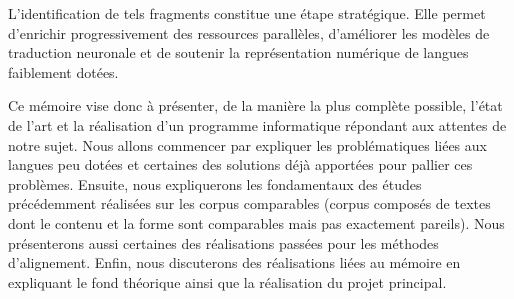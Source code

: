 L’identification de tels fragments constitue une étape stratégique. Elle permet d’enrichir progressivement
des ressources parallèles, d’améliorer les modèles de traduction neuronale et de soutenir la représentation numérique de
langues faiblement dotées.

Ce mémoire vise donc à présenter, de la manière la plus complète possible, l'état de l'art et
la réalisation d'un programme informatique répondant aux attentes de notre sujet.
Nous allons commencer par expliquer les problématiques liées aux langues peu dotées et certaines
des solutions déjà apportées pour pallier ces problèmes. Ensuite, nous expliquerons les fondamentaux des études précédemment
réalisées sur les corpus comparables (corpus composés de textes dont le contenu et la forme sont comparables mais pas exactement pareils). 
Nous présenterons aussi certaines des réalisations passées pour
les méthodes d'alignement. Enfin, nous discuterons des réalisations liées au mémoire en expliquant le fond
théorique ainsi que la réalisation du projet principal.